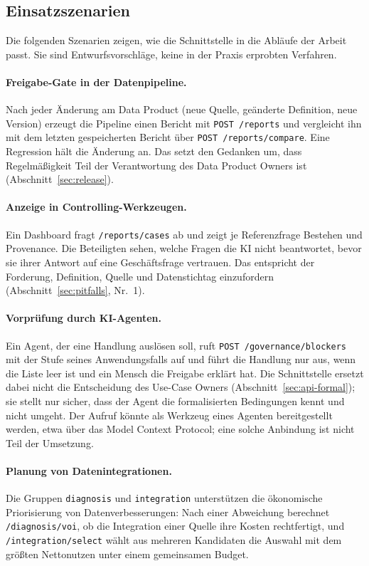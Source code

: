 \documentclass[a4paper,12pt]{article}
\theoremstyle{definition}
\begin{document}
\subsection{Einsatzszenarien}
\label{sec:api-use}
Die folgenden Szenarien zeigen, wie die Schnittstelle in die Abläufe der Arbeit passt. Sie sind Entwurfsvorschläge, keine in der Praxis erprobten Verfahren.

\paragraph{Freigabe-Gate in der Datenpipeline.}
Nach jeder Änderung am Data Product (neue Quelle, geänderte Definition, neue Version) erzeugt die Pipeline einen Bericht mit \texttt{POST /reports} und vergleicht ihn mit dem letzten gespeicherten Bericht über \texttt{POST /reports/compare}. Eine Regression hält die Änderung an. Das setzt den Gedanken um, dass Regelmäßigkeit Teil der Verantwortung des Data Product Owners ist (Abschnitt~\ref{sec:release}).

\paragraph{Anzeige in Controlling-Werkzeugen.}
Ein Dashboard fragt \texttt{/reports/cases} ab und zeigt je Referenzfrage Bestehen und Provenance. Die Beteiligten sehen, welche Fragen die KI nicht beantwortet, bevor sie ihrer Antwort auf eine Geschäftsfrage vertrauen. Das entspricht der Forderung, Definition, Quelle und Datenstichtag einzufordern (Abschnitt~\ref{sec:pitfalls}, Nr.~1).

\paragraph{Vorprüfung durch KI-Agenten.}
Ein Agent, der eine Handlung auslösen soll, ruft \texttt{POST /governance/blockers} mit der Stufe seines Anwendungsfalls auf und führt die Handlung nur aus, wenn die Liste leer ist und ein Mensch die Freigabe erklärt hat. Die Schnittstelle ersetzt dabei nicht die Entscheidung des Use-Case Owners (Abschnitt~\ref{sec:api-formal}); sie stellt nur sicher, dass der Agent die formalisierten Bedingungen kennt und nicht umgeht. Der Aufruf könnte als Werkzeug eines Agenten bereitgestellt werden, etwa über das Model Context Protocol; eine solche Anbindung ist nicht Teil der Umsetzung.

\paragraph{Planung von Datenintegrationen.}
Die Gruppen \texttt{diagnosis} und \texttt{integration} unterstützen die ökonomische Priorisierung von Datenverbesserungen: Nach einer Abweichung berechnet \texttt{/diagnosis/voi}, ob die Integration einer Quelle ihre Kosten rechtfertigt, und \texttt{/integration/select} wählt aus mehreren Kandidaten die Auswahl mit dem größten Nettonutzen unter einem gemeinsamen Budget.
\end{document}
